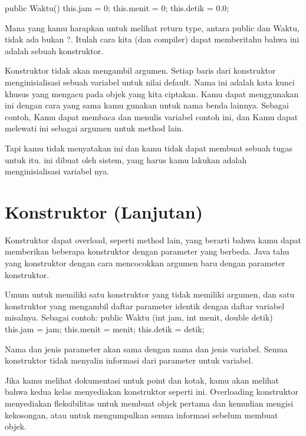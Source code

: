 public Waktu()\textbraceleft \newline
	this.jam = 0; \newline
	this.menit = 0; \newline
	this.detik = 0.0; \newline
\textbraceright	


Mana yang kamu harapkan untuk melihat return type, antara public dan Waktu, tidak ada bukan ?. Itulah cara kita (dan compiler) dapat memberitahu bahwa ini adalah sebuah konstruktor.

Konstruktor tidak akan mengambil argumen. Setiap baris dari konstruktor menginisialisasi sebuah variabel untuk nilai default. Nama ini adalah kata kunci khusus yang mengacu pada objek yang kita ciptakan. Kamu dapat menggunakan ini dengan cara yang sama kamu gunakan untuk nama benda lainnya. Sebagai contoh, Kamu dapat membaca dan menulis variabel contoh ini, dan Kamu dapat melewati ini sebagai argumen untuk method lain.

Tapi kamu tidak menyatakan ini dan kamu tidak dapat membuat sebuah tugas untuk itu. ini dibuat oleh sistem, yang harus kamu lakukan adalah menginisialisasi variabel nya.

\section{Konstruktor (Lanjutan)}

Konstruktor dapat overload, seperti method lain, yang berarti bahwa kamu dapat memberikan beberapa konstruktor dengan parameter yang berbeda. Java tahu yang konstruktor dengan cara mencocokkan argumen baru dengan parameter konstruktor.

Umum untuk memiliki satu konstruktor yang tidak memiliki argumen, dan satu konstruktor yang mengambil daftar parameter identik dengan daftar variabel misalnya. Sebagai contoh:
\newline
public Waktu (int jam, int menit, double detik)\textbraceleft \newline
	this.jam = jam; \newline
	this.menit = menit; \newline
	this.detik = detik; \newline
\textbraceright \newline

Nama dan jenis parameter akan sama dengan nama dan jenis variabel. Semua konstruktor tidak menyalin informasi dari parameter untuk variabel.

Jika kamu melihat dokumentasi untuk point dan kotak, kamu akan melihat bahwa kedua kelas menyediakan konstruktor seperti ini. Overloading konstruktor menyediakan fleksibilitas untuk membuat objek pertama dan kemudian mengisi kekosongan, atau untuk mengumpulkan semua informasi sebelum membuat objek.

